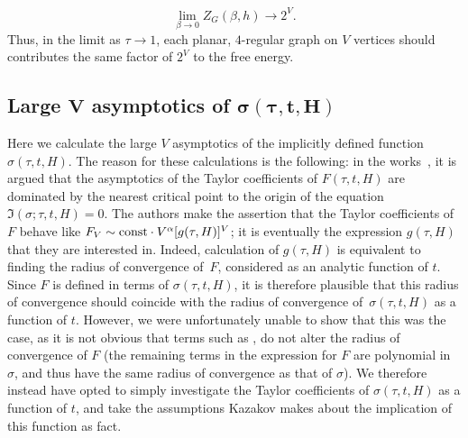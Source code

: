 \documentclass[pdftex]{sigma}
\numberwithin{equation}{section}
\begin{document}
\begin{Remark}
 \begin{equation*}
 \lim_{\beta\to 0}Z_G(\beta,h) \to 2^V.
 \end{equation*}
 Thus, in the limit as $\tau\to 1$, each planar, $4$-regular graph on $V$ vertices should contributes the same factor of $2^V$ to the free energy.
\end{Remark}

\subsection[Large $V$ asymptotics of $\sigma(\tau,t,H)$]{Large $\boldsymbol{V}$ asymptotics of $\boldsymbol{\sigma(\tau,t,H)}$}
Here we calculate the large $V$ asymptotics of the implicitly defined function $\sigma(\tau,t,H)$. The reason for these calculations is the following: in the works~\cite{Kazakov2,Kazakov1}, it is argued that the asymptotics of the Taylor coefficients of $F(\tau,t,H)$ are dominated by the nearest critical point to the origin of the equation $\mathfrak{I}(\sigma;\tau,t,H) = 0$. The authors make the assertion that the Taylor coefficients of~$F$ behave like $F_V \sim {\rm const}\cdot V^\alpha[g(\tau,H)]^V$; it is eventually the expression $g(\tau,H)$ that they are interested in. Indeed, calculation of $g(\tau,H)$ is equivalent to finding the radius of convergence of~$F$, considered
as an analytic function of $t$. Since $F$ is defined in terms of $\sigma(\tau,t,H)$, it is therefore plausible that this radius of convergence should coincide with the radius of convergence of~$\sigma(\tau,t,H)$ as a function of $t$. However, we were unfortunately unable to show
that this was the case, as it is not obvious that terms such as ,  do
not alter the radius of convergence of $F$ (the remaining terms in the expression for $F$ are polynomial in $\sigma$, and thus have the same radius of convergence as that of $\sigma$). We therefore instead have opted to simply investigate the Taylor coefficients of $\sigma(\tau,t,H)$ as a function of $t$, and take the assumptions Kazakov makes about the implication of this function as fact.
\end{document}
